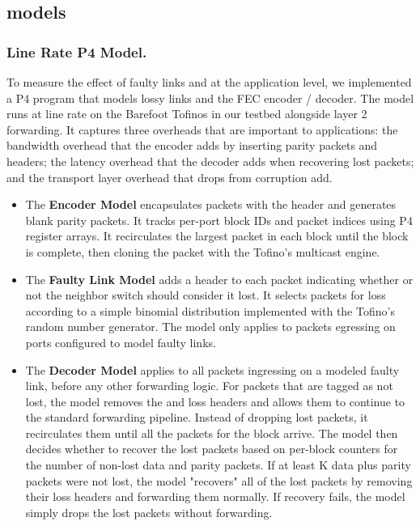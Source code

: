 \subsection{\OurSys models}

\subsubsection{Line Rate P4 Model.} To measure the effect of faulty links and
\OurSys at the application level, we implemented a P4 program that models
lossy links and the FEC encoder / decoder. The model runs at line rate on the
Barefoot Tofinos in our testbed alongside layer 2 forwarding. It captures
three overheads that are important to applications: the bandwidth overhead
that the encoder adds by inserting parity packets and \OurSys headers; the
latency overhead that the decoder adds when recovering lost packets; and the
transport layer overhead that  drops from corruption add.


\begin{itemize}

\item The \textbf{Encoder Model} encapsulates packets with the \OurSys  header
and generates blank parity packets. It tracks per-port block IDs and  packet
indices using P4 register arrays. It recirculates the largest packet in each
block until the block is complete, then cloning the packet with the Tofino's
multicast engine.

\item The \textbf{Faulty Link Model} adds a header to each packet
indicating whether or not the neighbor switch should consider it lost. It
selects packets for loss according to a simple binomial distribution
implemented with the Tofino's random number generator. The model only 
applies to packets egressing on ports configured to model faulty links. 

\item The \textbf{Decoder Model} applies to all packets ingressing on a
modeled faulty link, before any other forwarding logic. For packets  that are
tagged as not lost, the model removes the \OurSys and loss  headers and allows
them to continue to the standard forwarding  pipeline. Instead of dropping
lost packets, it recirculates them until all the packets  for the block
arrive. The model then decides whether to recover the  lost packets based on
per-block counters for the number of non-lost  data and parity packets. If at
least K data plus parity packets were not lost, the model  "recovers" all of
the lost packets by removing their loss headers and  forwarding them normally.
If recovery fails, the model simply drops the  lost packets without
forwarding.

\end{itemize}

